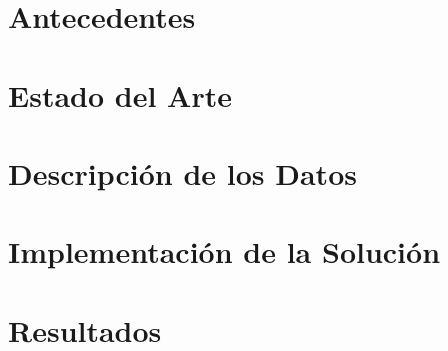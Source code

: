 \chapter{Antecedentes}

\chapter{Estado del Arte}

\chapter{Descripción de los Datos}

\chapter{Implementación de la Solución}

\chapter{Resultados}

